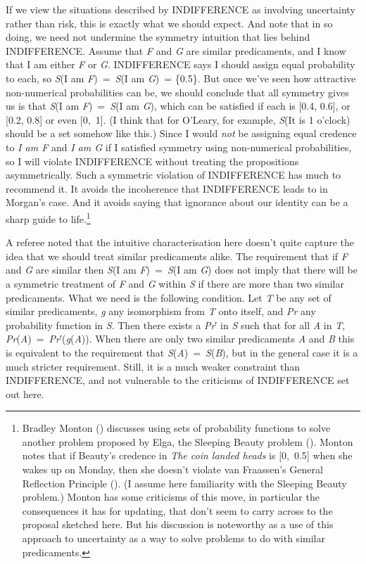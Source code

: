 \documentclass[
  10pt,
  letterpaper,
  DIV=11,
  numbers=noendperiod,
  twoside]{scrartcl}
\begin{document}
If we view the situations described by INDIFFERENCE as involving
uncertainty rather than risk, this is exactly what we should expect. And
note that in so doing, we need not undermine the symmetry intuition that
lies behind INDIFFERENCE. Assume that \emph{F} and \emph{G} are similar
predicaments, and I know that I am either \emph{F} or \emph{G}.
INDIFFERENCE says I should assign equal probability to each, so
\emph{S}(I am \emph{F})~=~\emph{S}(I am \emph{G})~= \{0.5\}. But once
we've seen how attractive non-numerical probabilities can be, we should
conclude that all symmetry gives us is that \emph{S}(I am
\emph{F})~=~\emph{S}(I am \emph{G}), which can be satisfied if each is
{[}0.4, 0.6{]}, or {[}0.2, 0.8{]} or even {[}0,~1{]}. (I think that for
O'Leary, for example, \emph{S}(It is 1 o'clock) should be a set somehow
like this.) Since I would \emph{not} be assigning equal credence to
\emph{I am F} and \emph{I am G} if I satisfied symmetry using
non-numerical probabilities, so I will violate INDIFFERENCE without
treating the propositions asymmetrically. Such a symmetric violation of
INDIFFERENCE has much to recommend it. It avoids the incoherence that
INDIFFERENCE leads to in Morgan's case. And it avoids saying that
ignorance about our identity can be a sharp guide to life.\footnote{Bradley
  Monton () discusses using sets of
  probability functions to solve another problem proposed by Elga, the
  Sleeping Beauty problem ().
  Monton notes that if Beauty's credence in \emph{The coin landed heads}
  is {[}0,~0.5{]} when she wakes up on Monday, then she doesn't violate
  van Fraassen's General Reflection Principle
  (). (I assume here
  familiarity with the Sleeping Beauty problem.) Monton has some
  criticisms of this move, in particular the consequences it has for
  updating, that don't seem to carry across to the proposal sketched
  here. But his discussion is noteworthy as a use of this approach to
  uncertainty as a way to solve problems to do with similar
  predicaments.}

A referee noted that the intuitive characterisation here doesn't quite
capture the idea that we should treat similar predicaments alike. The
requirement that if \emph{F} and \emph{G} are similar then \emph{S}(I am
\emph{F})~=~\emph{S}(I am \emph{G}) does not imply that there will be a
symmetric treatment of \emph{F} and \emph{G} within \emph{S} if there
are more than two similar predicaments. What we need is the following
condition. Let \emph{T} be any set of similar predicaments, \emph{g} any
isomorphism from \emph{T} onto itself, and \emph{Pr} any probability
function in \emph{S}. Then there exists a \emph{Pr}′ in \emph{S} such
that for all \emph{A} in \emph{T},
\emph{Pr}(\emph{A})~=~\emph{Pr}′(\emph{g}(\emph{A})). When there are
only two similar predicaments \emph{A} and \emph{B} this is equivalent
to the requirement that \emph{S}(\emph{A})~=~\emph{S}(\emph{B}), but in
the general case it is a much stricter requirement. Still, it is a much
weaker constraint than INDIFFERENCE, and not vulnerable to the
criticisms of INDIFFERENCE set out here.
\end{document}
